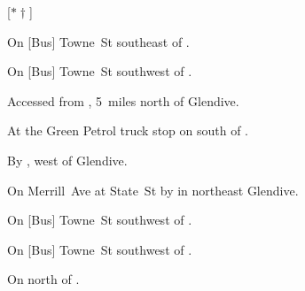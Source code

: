 
[$\ast\dagger$]

\begin{LocationList}

On [Bus] Towne~St southeast of .

On [Bus] Towne~St southwest of .

Accessed from , 5~miles north of Glendive.

At the Green Petrol truck stop on  south of  .

By ,
west of Glendive.

On Merrill~Ave at State~St by   in northeast Glendive.

On [Bus] Towne~St southwest of .

On [Bus] Towne~St southwest of .

\Location{\TruckStop \Gas \Rest \Weigh}
On  north of  .

\end{LocationList}
